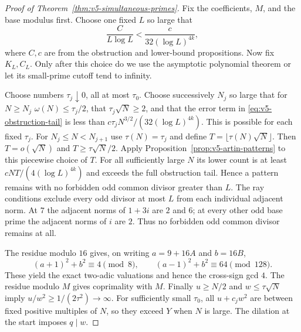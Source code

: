 \begin{proof}[Proof of Theorem~\ref{thm:v5-simultaneous-primes}]
Fix the coefficients, $M$, and the base modulus first. Choose one fixed
$L$ so large that
\[
 \frac C{L\log L}<\frac c{32(\log L)^{4k}},
\]
where $C,c$ are from the obstruction and lower-bound propositions.
Now fix $K_L,C_L$. Only after this choice do we use the asymptotic
polynomial theorem or let its small-prime cutoff tend to infinity.

Choose numbers $\tau_j\downarrow0$, all at most $\tau_0$.
Choose successively $N_j$ so large that for $N\geq N_j$
$\omega(N)\leq\tau_j/2$,
that $\tau_j\sqrt N\geq2$, and that the error term in
\eqref{eq:v5-obstruction-tail} is less than
$c\tau_jN^{3/2}/(32(\log L)^{4k})$.
This is possible for each fixed $\tau_j$.
For $N_j\leq N<N_{j+1}$ use $\tau(N)=\tau_j$ and define
$T=\lfloor\tau(N)\sqrt N\rfloor$.
Then $T=o(\sqrt N)$ and $T\geq\tau\sqrt N/2$.
Apply Proposition~\ref{prop:v5-artin-patterns} to this piecewise choice
of $T$. For all sufficiently large $N$ its lower count is at least
$cNT/(4(\log L)^{4k})$ and exceeds the full obstruction tail.
Hence a pattern remains with no forbidden odd
common divisor greater than $L$.
The ray conditions exclude every odd divisor at most $L$ from each
individual adjacent norm. At $7$ the adjacent norms of $1+3i$ are $2$
and $6$; at every other odd base prime the adjacent norms of $i$ are $2$.
Thus no forbidden odd common divisor remains at all.

The residue modulo $16$ gives, on writing $a=9+16A$ and $b=16B$,
\[
 (a+1)^2+b^2\equiv4\pmod8,\qquad
 (a-1)^2+b^2\equiv64\pmod{128}.
\]
These yield the exact two-adic valuations and hence the cross-sign gcd
$4$. The residue modulo $M$ gives coprimality with $M$.
Finally $u\geq N/2$ and $w\leq\tau\sqrt N$ imply
$u/w^2\geq1/(2\tau^2)\to\infty$.
For sufficiently small $\tau_0$, all $u+c_jw^2$ are between fixed positive
multiples of $N$, so they exceed $Y$ when $N$ is large.
The dilation at the start imposes $q\mid w$.
\end{proof}
